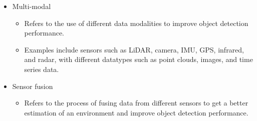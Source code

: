 \documentclass[rnd]{mas_proposal}
\begin{document}
\begin{itemize}
\begin{itemize}
\begin{itemize}
                \end{itemize}
            \item Multi-modal
                \begin{itemize}
                    \item Refers to the use of different data modalities to improve object detection performance.
                    \item Examples include sensors such as LiDAR, camera, IMU, GPS, infrared, and radar, with different datatypes such as point clouds, images, and time series data.
                \end{itemize}
            \item Sensor fusion
                \begin{itemize}
                    \item Refers to the process of fusing data from different sensors to get a better estimation of an environment and improve object detection performance.
                \end{itemize}
        \end{itemize}

        
        
        

\end{itemize}
\end{document}
